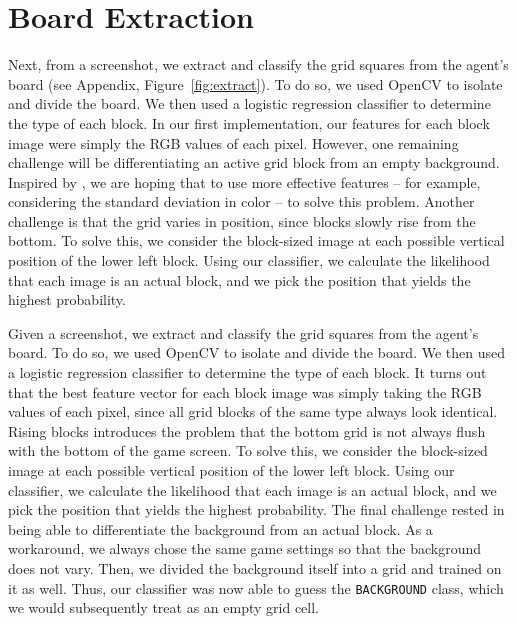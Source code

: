 \documentclass[12pt]{IEEEtran}
\begin{document}
\section{Board Extraction}

Next, from a screenshot, we extract and classify the grid squares from the agent's board (see Appendix, Figure~\ref{fig:extract}). To do so, we used OpenCV to isolate and divide the board. We then used a logistic regression classifier to determine the type of each block. In our first implementation, our features for each block image were simply the RGB values of each pixel. However, one remaining challenge will be differentiating an active grid block from an empty background. Inspired by \cite{1}, we are hoping that to use more effective features -- for example, considering the standard deviation in color -- to solve this problem. Another challenge is that the grid varies in position, since blocks slowly rise from the bottom. To solve this, we consider the block-sized image at each possible vertical position of the lower left block. Using our classifier, we calculate the likelihood that each image is an actual block, and we pick the position that yields the highest probability.

Given a screenshot, we extract and classify the grid squares from the agent's board. To do so, we used OpenCV to isolate and divide the board. We then used a logistic regression classifier to determine the type of each block. It turns out that the best feature vector for each block image was simply taking the RGB values of each pixel, since all grid blocks of the same type always look identical. Rising blocks introduces the problem that the bottom grid is not always flush with the bottom of the game screen. To solve this, we consider the block-sized image at each possible vertical position of the lower left block. Using our classifier, we calculate the likelihood that each image is an actual block, and we pick the position that yields the highest probability. The final challenge rested in being able to differentiate the background from an actual block. As a workaround, we always chose the same game settings so that the background does not vary. Then, we divided the background itself into a grid and trained on it as well. Thus, our classifier was now able to guess the \texttt{BACKGROUND} class, which we would subsequently treat as an empty grid cell.
\end{document}
